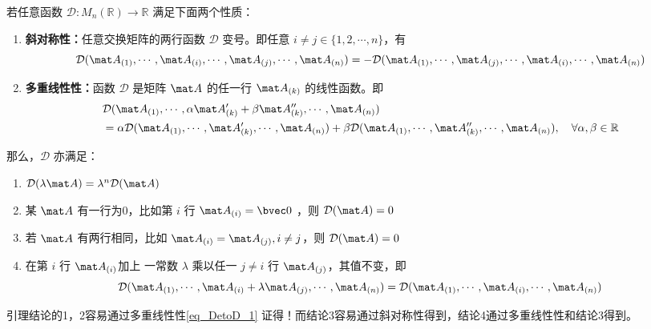 \begin{lemma}{}\label{lem_DetoD_1}
若任意函数 $\mathcal D:M_n(\mathbb R)\rightarrow \mathbb R$ 满足下面两个性质：
\begin{enumerate}
\item \textbf{斜对称性：}任意交换矩阵的两行函数 $\mathcal D$ 变号。即任意 $i\neq j\in \{1,2,\cdots,n\}$，有
\begin{equation}
\mathcal D(\mat A_{(1)},\cdots,\mat A_{(i)},\cdots,\mat A_{(j)},\cdots,\mat A_{(n)})=-\mathcal D(\mat A_{(1)},\cdots,\mat A_{(j)},\cdots,\mat A_{(i)},\cdots,\mat A_{(n)})
\end{equation}
\item \textbf{多重线性性：}函数 $\mathcal D$ 是矩阵 $\mat A$ 的任一行 $\mat A_{(k)}$ 的线性函数。即
\begin{equation}\label{eq_DetoD_1}
\begin{aligned}
&\mathcal D(\mat A_{(1)},\cdots,\alpha \mat A'_{(k)}+\beta\mat A''_{(k)},\cdots,\mat A_{(n)})\\
&=\alpha\mathcal D(\mat A_{(1)},\cdots,\mat A'_{(k)},\cdots,\mat A_{(n)})+\beta\mathcal D(\mat A_{(1)},\cdots,\mat A''_{(k)},\cdots,\mat A_{(n)}),\quad\forall\alpha,\beta\in\mathbb R
\end{aligned}
\end{equation}
\end{enumerate}
那么，$\mathcal D$ 亦满足：
\begin{enumerate}
\item $\mathcal D(\lambda\mat A)=\lambda^n\mathcal D(\mat A)$
\item 某 $\mat A$ 有一行为0，比如第 $i$ 行 $\mat A_{(i)}=\bvec 0$ ，则 $\mathcal D(\mat A)=0$
\item 若 $\mat A$ 有两行相同，比如 $\mat A_{(i)}=\mat A_{(j)},i\neq j$，则 $\mathcal D(\mat A)=0$
\item 在第 $i$ 行 $\mat A_{(i)}$加上 一常数 $\lambda$ 乘以任一 $j\neq i$ 行 $\mat A_{(j)}$，其值不变，即
\begin{equation}
\mathcal D(\mat A_{(1)},\cdots,\mat A_{(i)}+\lambda \mat A_{(j)},\cdots,\mat A_{(n)})=\mathcal D(\mat A_{(1)},\cdots,\mat A_{(i)},\cdots,\mat A_{(n)})
\end{equation}
\end{enumerate}
\end{lemma}
引理结论的1，2容易通过多重线性性\autoref{eq_DetoD_1} 证得！而结论3容易通过斜对称性得到，结论4通过多重线性性和结论3得到。

